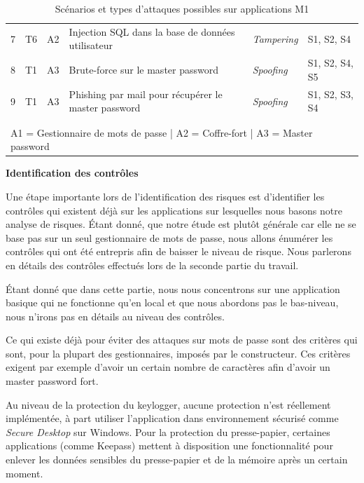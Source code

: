 \begin{table}[H]
{\begin{tabular}{ccclll}
			7 & T6   & A2           & Injection SQL dans la base de données utilisateur                                                                                                                           & \textit{Tampering}           & S1, S2, S4 	 \\  
			8 & T1   & A3           & Brute-force sur le master password                                                                                            & \textit{Spoofing}      & S1, S2, S4, S5  \\			
			9 & T1   & A3           & Phishing par mail pour récupérer le master password  	  & \textit{Spoofing}   & S1, S2, S3, S4    \\		                                                                                                         
			\\\\	\hline 
			\multicolumn{6}{l}{A1 = Gestionnaire de mots de passe | A2 = Coffre-fort | A3 = Master password}\\ \hline
	\end{tabular}}
\caption{Scénarios et types d'attaques possibles sur applications M1}
\end{table}

\textbf{Identification des contrôles}

Une étape importante lors de l'identification des risques est d'identifier les contrôles qui existent déjà sur les applications sur lesquelles nous basons notre analyse de risques. Étant donné, que notre étude est plutôt générale car elle ne se base pas sur un seul gestionnaire de mots de passe, nous allons énumérer les contrôles qui ont été entrepris afin de baisser le niveau de risque. Nous parlerons en détails des contrôles effectués lors de la seconde partie du travail.

Étant donné que dans cette partie, nous nous concentrons sur une application basique qui ne fonctionne qu'en local et que nous abordons pas le bas-niveau, nous n'irons pas en détails au niveau des contrôles. 

Ce qui existe déjà pour éviter des attaques sur mots de passe sont des critères qui sont, pour la plupart des gestionnaires, imposés par le constructeur. Ces critères exigent par exemple d'avoir un certain nombre de caractères afin d'avoir un master password fort.

Au niveau de la protection du keylogger, aucune protection n'est réellement implémentée, à part utiliser l'application dans environnement sécurisé comme \textit{Secure Desktop} sur Windows. Pour la protection du presse-papier, certaines applications (comme Keepass) mettent à disposition une fonctionnalité pour enlever les données sensibles du presse-papier et de la mémoire après un certain moment.

